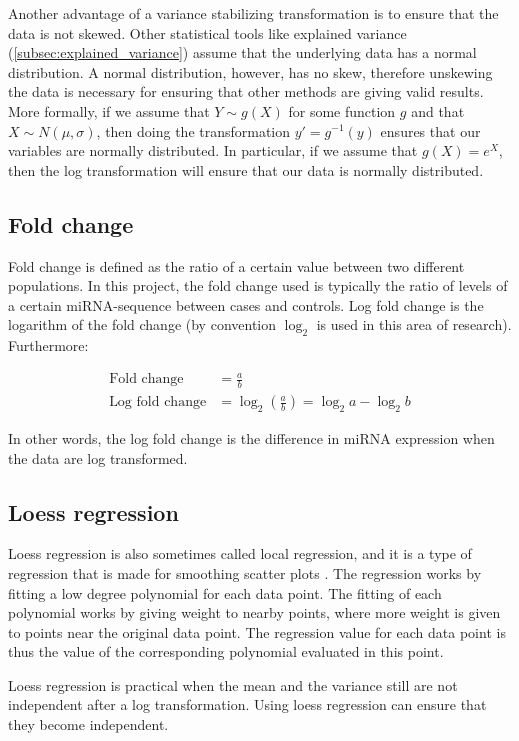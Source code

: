 Another advantage of a variance stabilizing transformation is to ensure that the data is not skewed. Other statistical tools like explained variance (\autoref{subsec:explained_variance}) assume that the underlying data has a normal distribution. A normal distribution, however, has no skew, therefore unskewing the data is necessary for ensuring that other methods are giving valid results. More formally, if we assume that $Y \sim g(X)$ for some function $g$ and that $X \sim N(\mu, \sigma)$, then doing the transformation $y' = g^{-1}(y)$ ensures that our variables are normally distributed. In particular, if we assume that $g(X) = e^{X}$, then the log transformation will ensure that our data is normally distributed. 

\subsection{Fold change}
Fold change is defined as the ratio of a certain value between two different populations. In this project, the fold change used is typically the ratio of levels of a certain miRNA-sequence between cases and controls. Log fold change is the logarithm of the fold change (by convention $\log_2$ is used in this area of research). Furthermore: 

\begin{align*}
    \text{Fold change} &= \frac{a}{b} \\
    \text{Log fold change} &= \log_2 \left(\frac{a}{b}\right) = \log_2 a - \log_2 b
\end{align*}

In other words, the log fold change is the difference in miRNA expression when the data are log transformed.

\subsection{Loess regression}
\label{subsec:loess_regression}

Loess regression is also sometimes called local regression, and it is a type of regression that is made for smoothing scatter plots \citep{loess}. The regression works by fitting a low degree polynomial for each data point. The fitting of each polynomial works by giving weight to nearby points, where more weight is given to points near the original data point. The regression value for each data point is thus the value of the corresponding polynomial evaluated in this point.

Loess regression is practical when the mean and the variance still are not independent after a log transformation. Using loess regression can ensure that they become independent.


